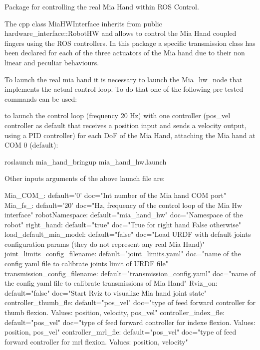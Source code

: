 Package for controlling the real Mia Hand within R\+OS Control.

The cpp class Mia\+H\+W\+Interface inherits from public hardware\+\_\+interface\+::\+Robot\+HW and allows to control the Mia Hand coupled fingers using the R\+OS controllers. In this package a specific transmission class has been declared for each of the three actuators of the Mia hand due to their non linear and peculiar behaviours.

To launch the real mia hand it is necessary to launch the Mia\+\_\+hw\+\_\+node that implements the actual control loop. To do that one of the following pre-\/tested commands can be used\+:


\begin{DoxyItemize}
\item to launch the control loop (frequency 20 Hz) with one controller (pos\+\_\+vel controller as default that receives a position input and sends a velocity output, using a P\+ID controller) for each DoF of the Mia Hand, attaching the Mia hand at C\+OM 0 (default)\+: \begin{DoxyVerb}roslaunch mia_hand_bringup mia_hand_hw.launch
\end{DoxyVerb}


Other inputs arguments of the above launch file are\+: \begin{DoxyVerb}Mia_COM_:                         default='0'                         doc="Int number of the Mia hand COM port"
Mia_fs_:                          default='20'                        doc="Hz, frequency of the control loop of the Mia Hw interface"
robotNamespace:                   default="mia_hand_hw"               doc="Namespace of the robot"
right_hand:                       default="true"                      doc="True for right hand False otherwise"
load_default_mia_model:           default="false"                     doc="Load URDF with default joints configuration params (they do not represent any real Mia Hand)"
joint_limits_config_filename:     default="joint_limits.yaml"         doc="name of the config yaml file to calibrate joints limit of URDF file"
transmission_config_filename:     default="transmission_config.yaml"  doc="name of the config yaml file to calibrate transmissions of Mia Hand"
Rviz_on:                          default="false"                     doc="Start Rviz to visualize Mia hand joint state"
controller_thumb_fle:             default="pos_vel"                   doc="type of feed forward controller for thumb flexion. Values: position, velocity, pos_vel"
controller_index_fle:             default="pos_vel"                   doc="type of feed forward controller for indexe flexion. Values: position, pos_vel"
controller_mrl_fle:               default="pos_vel"                   doc="type of feed forward controller for mrl flexion. Values: position, velocity"
\end{DoxyVerb}


\end{DoxyItemize}
